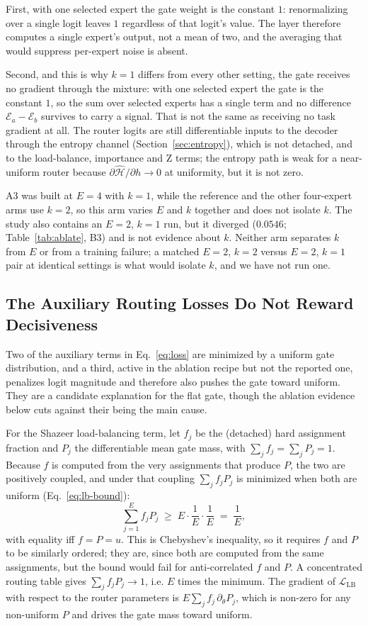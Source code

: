 \documentclass[10pt,a4paper,twocolumn,twoside]{article}
\newcommand{\E}{\mathcal{E}}
\newcommand{\Hs}{\hat{\mathcal{H}}}
\begin{document}
First, with one selected expert the gate weight is the constant
$1$: renormalizing over a single logit leaves $1$ regardless of that logit's value. The layer
therefore computes a single expert's output, not a mean of two, and the averaging that would
suppress per-expert noise is absent.

Second, and this is why $k{=}1$ differs from every other setting, the gate receives no
gradient through the mixture: with one selected expert the gate is the constant $1$, so
the sum over selected experts has a single term and no difference $\E_a - \E_b$ survives to
carry a signal. That is not the same as receiving no task gradient at all. The router logits are
still differentiable inputs to the decoder through the entropy channel
(Section~\ref{sec:entropy}), which is not detached, and to the load-balance, importance and Z
terms; the entropy path is weak for a near-uniform router because
$\partial\Hs/\partial h \to 0$ at uniformity, but it is not zero.

A3 was built at $E{=}4$ with $k{=}1$, while the reference and the
other four-expert arms use $k{=}2$, so this arm varies $E$ and $k$ together and does not isolate
$k$. The study also contains an $E{=}2$, $k{=}1$ run, but it diverged ($0.0546$;
Table~\ref{tab:ablate}, B3) and is not evidence about $k$. Neither arm separates $k$ from $E$ or
from a training failure; a matched $E{=}2$, $k{=}2$ versus $E{=}2$, $k{=}1$ pair at identical
settings is what would isolate $k$, and we have not run one.

\subsection{The Auxiliary Routing Losses Do Not Reward Decisiveness}
Two of the auxiliary terms in Eq.~\eqref{eq:loss} are minimized by a uniform gate distribution, and
a third, active in the ablation recipe but not the reported one, penalizes logit
magnitude and therefore also pushes the gate toward uniform. They are a candidate explanation
for the flat gate, though the ablation evidence below cuts against their being the main cause.

For the Shazeer load-balancing term, let $f_j$ be the (detached) hard assignment fraction and
$P_j$ the differentiable mean gate mass, with $\sum_j f_j = \sum_j P_j = 1$. Because $f$ is
computed from the very assignments that produce $P$, the two are positively coupled, and under
that coupling $\sum_j f_j P_j$ is minimized when both are uniform (Eq.~\eqref{eq:lb-bound}):
\begin{equation}
  \sum_{j=1}^{E} f_j P_j \;\ge\; E \cdot \frac{1}{E}\cdot\frac{1}{E} \;=\; \frac{1}{E},
  \label{eq:lb-bound}
\end{equation}
with equality iff $f = P = u$. This is Chebyshev's inequality, so it requires $f$ and $P$
to be similarly ordered; they are, since both are computed from the same assignments, but the
bound would fail for anti-correlated $f$ and $P$. A concentrated routing table gives
$\sum_j f_j P_j \to 1$, i.e. $E$ times the minimum. The gradient of $\mathcal{L}_{\text{LB}}$
with respect to the router parameters is $E\sum_j f_j \,\partial_\theta P_j$, which is non-zero
for any non-uniform $P$ and drives the gate mass toward uniform.
\end{document}
